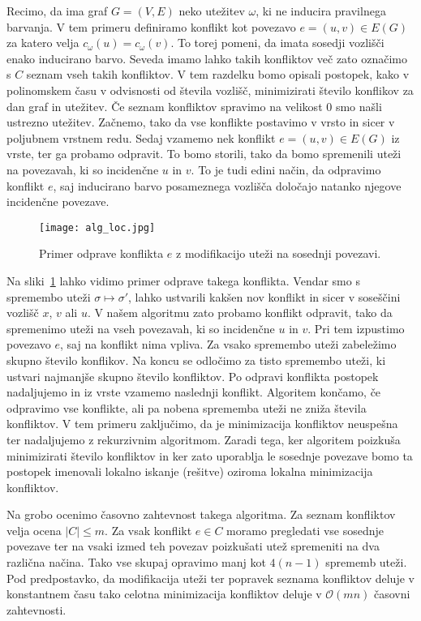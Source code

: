\documentclass[12pt,a4paper,twoside]{article}
\theoremstyle{definition} %
\theoremstyle{plain} %
\numberwithin{equation}{section}  %
\begin{document}
Recimo, da ima graf $G = (V, E)$ neko utežitev $\omega$, ki ne inducira pravilnega barvanja. V tem primeru definiramo konflikt kot povezavo $e =(u, v) \in E(G)$ za katero velja $c_{\omega}(u) = c_{\omega}(v)$. To torej pomeni, da imata sosedji vozlišči enako inducirano barvo. Seveda imamo lahko takih konfliktov več zato označimo s $C$ seznam vseh takih konfliktov. V tem razdelku bomo opisali postopek, kako v polinomskem času v odvisnosti od števila vozlišč, minimizirati število konflikov za dan graf in utežitev. Če seznam konfliktov spravimo na velikost $0$ smo našli ustrezno utežitev. Začnemo, tako da vse konflikte postavimo v vrsto in sicer v poljubnem vrstnem redu. Sedaj vzamemo nek konflikt $e = (u, v) \in E(G)$ iz vrste, ter ga probamo odpravit. To bomo storili, tako da bomo spremenili uteži na povezavah, ki so incidenčne $u$ in $v$. To je tudi edini način, da odpravimo konflikt $e$, saj inducirano barvo posameznega vozlišča določajo natanko njegove incidenčne povezave.
 \begin{figure}[h]
\caption{Primer odprave konflikta $e$ z modifikacijo uteži na sosednji povezavi.}
\label{alg_loc}
\centering
    \texttt{[image: alg\_loc.jpg]}
    \end{figure}
Na sliki~\ref{alg_loc} lahko vidimo primer odprave takega konflikta. Vendar smo s spremembo uteži $\sigma \mapsto\sigma'$, lahko ustvarili kakšen nov konflikt in sicer v soseščini vozlišč $x$, $v$ ali $u$. V našem algoritmu zato probamo konflikt odpravit, tako da spremenimo uteži na vseh povezavah, ki so incidenčne $u$ in $v$. Pri tem izpustimo povezavo $e$, saj na konflikt nima vpliva. Za vsako spremembo uteži zabeležimo skupno število konflikov. Na koncu se odločimo za tisto spremembo uteži, ki ustvari najmanjše skupno število konfliktov. Po odpravi konflikta postopek nadaljujemo in iz vrste vzamemo naslednji konflikt. Algoritem končamo, če odpravimo vse konflikte, ali pa nobena sprememba uteži ne zniža števila konfliktov. V tem primeru zaključimo, da je minimizacija konfliktov neuspešna ter nadaljujemo z rekurzivnim algoritmom. Zaradi tega, ker algoritem poizkuša minimizirati število konfliktov in ker zato uporablja le sosednje povezave bomo ta postopek imenovali lokalno iskanje (rešitve) oziroma lokalna minimizacija konfliktov.

Na grobo ocenimo časovno zahtevnost takega algoritma. Za seznam konfliktov velja ocena $|C| \le m$. Za vsak konflikt $e \in C$ moramo pregledati vse sosednje povezave ter na vsaki izmed teh povezav poizkušati utež spremeniti na dva različna načina. Tako vse skupaj opravimo manj kot $4(n-1)$ sprememb uteži. Pod predpostavko, da modifikacija uteži ter popravek seznama konfliktov deluje v konstantnem času tako celotna minimizacija konfliktov deluje v $\mathcal{O}(mn)$ časovni zahtevnosti.
\end{document}
